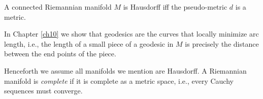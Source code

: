 \documentclass[../main]{subfiles}
\begin{document}
\begin{corollary} \label{cor:ch6.1.2}
A connected Riemannian manifold $M$ is Hausdorff iff the pseudo-metric $d$ is a metric.
\end{corollary}



In Chapter \ref{ch10} we show that geodesics are the curves that locally minimize arc length, i.e., the length of a small piece of a geodesic in $M$ is precisely the distance between the end points of the piece.

Henceforth we assume all manifolds we mention are Hausdorff. A Riemannian manifold is \emph{complete} if it is complete as a metric space, i.e., every Cauchy sequences must converge.
\end{document}
